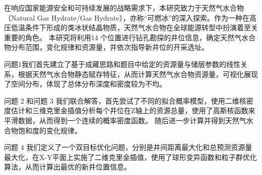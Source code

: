 

{\song\xiaosihao
\setlength{\parindent}{2em}
在响应国家能源安全和可持续发展的战略需求下，本研究致力于天然气水合物（Natural Gas Hydrate/Gas Hydrate），亦称“可燃冰”的深入探索。作为一种在高压低温条件下形成的类冰状结晶物质，天然气水合物在全球能源转型中扮演着至关重要的角色。
本研究将利用14 个位置进行钻孔勘探的井位信息，确定天然气水合物分布范围，变化规律和资源量，并依次指导新井位的开采选址。

\setlength{\parindent}{2em}问题1我们首先建立了基于成藏思路和题目中给定的资源量与储层参数的线性关系，根据天然气水合物静态赋存特征，从而计算天然气水合物资源量，可视化展现了空间分布，体现了总体分布深度和密度较为不均。

\setlength{\parindent}{2em}
问题 2 和问题 3 我们联合解答，首先尝试了不同的拟合概率模型，使用二维核密度估计和三维克里金插值分析每个井位在Z轴上的资源总量，使用了高斯核函数来平滑数据，从而得到一个连续的概率密度函数。
随后进一步计算并得到天然气水合物饱和度的变化规律。

\setlength{\parindent}{2em}问题 4 我们定义了一个双目标优化问题，分别是井间距离最大化和总预测资源量最大化，在X-Y平面上实施了二维克里金插值，使用了球形变异函数和粒子群优化算法，从而计算出最优的新井位置信息。
}





